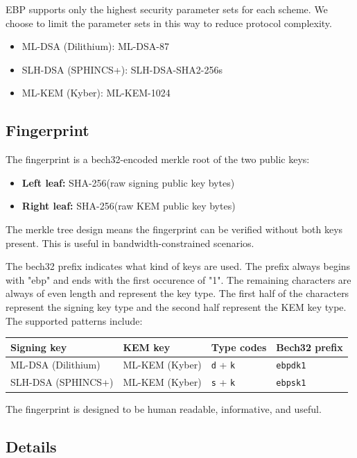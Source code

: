 \documentclass[11pt,a4paper]{article}
\begin{document}
EBP supports only the highest security parameter sets for each scheme. We choose to limit the parameter sets in this way to reduce protocol complexity.

\begin{itemize}
  \item ML-DSA (Dilithium): ML-DSA-87
  \item SLH-DSA (SPHINCS+): SLH-DSA-SHA2-256s
  \item ML-KEM (Kyber): ML-KEM-1024
\end{itemize}


\subsection{Fingerprint}

The fingerprint is a bech32-encoded merkle root of the two public keys:
\begin{itemize}
  \item \textbf{Left leaf:} SHA-256(raw signing public key bytes)
  \item \textbf{Right leaf:} SHA-256(raw KEM public key bytes)
\end{itemize}

The merkle tree design means the fingerprint can be verified without both keys present. This is useful in bandwidth-constrained scenarios.

The bech32 prefix indicates what kind of keys are used. The prefix always begins with "ebp" and ends with the first occurence of "1". The remaining characters are always of even length and represent the key type. The first half of the characters represent the signing key type and the second half represent the KEM key type. The supported patterns include:

\begin{center}
\begin{tabular}{|l|l|l|l|}
  \hline
  Signing key & KEM key & Type codes & Bech32 prefix \\
  \hline
  ML-DSA (Dilithium) & ML-KEM (Kyber) & \texttt{d} + \texttt{k} & \texttt{ebpdk1} \\
  SLH-DSA (SPHINCS+) & ML-KEM (Kyber) & \texttt{s} + \texttt{k} & \texttt{ebpsk1} \\
  \hline
\end{tabular}
\end{center}

\noindent
The fingerprint is designed to be human readable, informative, and useful. 

\subsection{Details}
\end{document}

